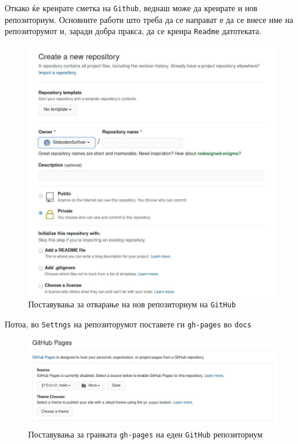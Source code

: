\documentclass[
]{book}
\begin{document}
Откако ќе креирате сметка на \texttt{Github}, веднаш може да креирате и нов репозиториум. Основните работи што треба да се направат е да се внесе име на репозиторумот и, заради добра пракса, да се креира \texttt{Readme} датотеката.

\begin{figure}
\centering
\includegraphics{www/make-git-repo.jpg}
\caption{Поставувања за отварање на нов репозиториум на \texttt{GitHub}}
\end{figure}

Потоа, во \texttt{Settngs} на репозиторумот поставете ги \texttt{gh-pages} во \texttt{docs}

\begin{figure}
\centering
\includegraphics{www/gh-pages.jpg}
\caption{Поставувања за гранката \texttt{gh-pages} на еден \texttt{GitHub} репозиториум}
\end{figure}
\end{document}
